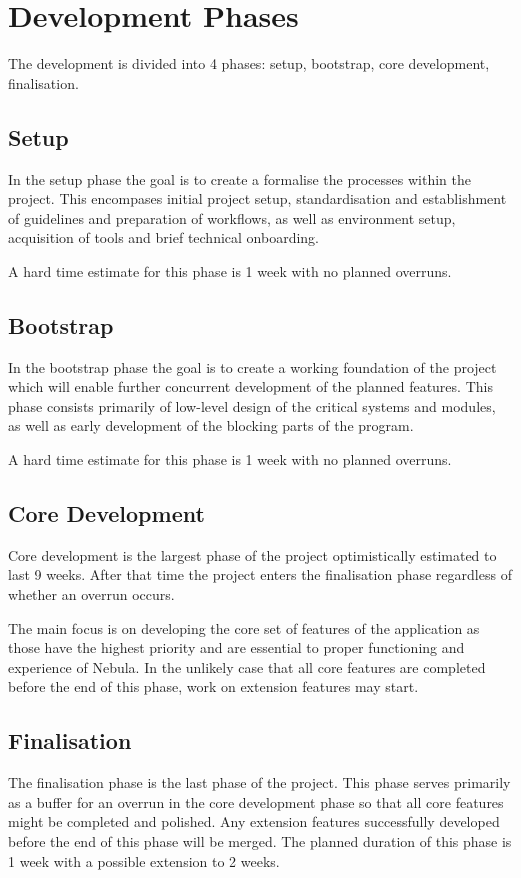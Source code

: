 \documentclass[12pt, a4paper]{article}
\begin{document}
\section{Development Phases}
The development is divided into 4 phases: setup, bootstrap, core development,
finalisation.

\subsection{Setup}
In the setup phase the goal is to create a formalise the processes within the
project. This encompases initial project setup, standardisation and
establishment of guidelines and preparation of workflows, as well as environment
setup, acquisition of tools and brief technical onboarding.

A hard time estimate for this phase is 1 week with no planned overruns.

\subsection{Bootstrap}
In the bootstrap phase the goal is to create a working foundation of the project
which will enable further concurrent development of the planned features. This
phase consists primarily of low-level design of the critical systems and
modules, as well as early development of the blocking parts of the program.

A hard time estimate for this phase is 1 week with no planned overruns.

\subsection{Core Development}
Core development is the largest phase of the project optimistically estimated to
last 9 weeks. After that time the project enters the finalisation phase
regardless of whether an overrun occurs.

The main focus is on developing the core set of features of the application as
those have the highest priority and are essential to proper functioning and
experience of Nebula. In the unlikely case that all core features are
completed before the end of this phase, work on extension features may start.

\subsection{Finalisation}
The finalisation phase is the last phase of the project. This phase serves
primarily as a buffer for an overrun in the core development phase so that all
core features might be completed and polished. Any extension features
successfully developed before the end of this phase will be merged. The planned
duration of this phase is 1 week with a possible extension to 2 weeks.
\end{document}
